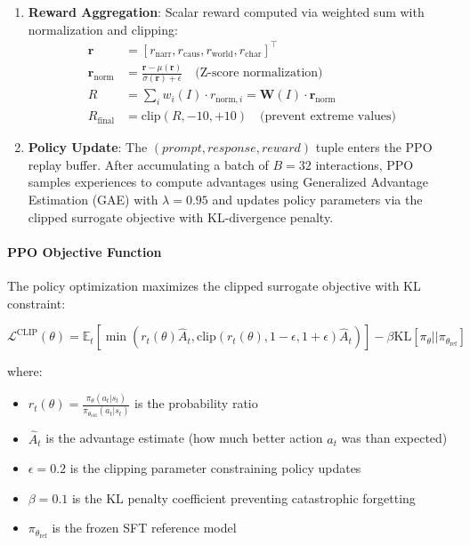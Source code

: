 \documentclass[11pt]{article}
\begin{document}
\begin{enumerate}
    Note: World and character critic weights set to 0.0 for the initial 2-critic configuration reported in Section 6. Full 4-critic integration planned for final submission.
    
    \item \textbf{Reward Aggregation}: Scalar reward computed via weighted sum with normalization and clipping:
    \begin{align}
        \mathbf{r} &= [r_{\text{narr}}, r_{\text{caus}}, r_{\text{world}}, r_{\text{char}}]^\top \\
        \mathbf{r}_{\text{norm}} &= \frac{\mathbf{r} - \mu(\mathbf{r})}{\sigma(\mathbf{r}) + \epsilon} \quad \text{(Z-score normalization)} \\
        R &= \sum_{i} w_i(I) \cdot r_{\text{norm},i} = \mathbf{W}(I) \cdot \mathbf{r}_{\text{norm}} \\
        R_{\text{final}} &= \text{clip}(R, -10, +10) \quad \text{(prevent extreme values)}
    \end{align}
    
    \item \textbf{Policy Update}: The $(prompt, response, reward)$ tuple enters the PPO replay buffer. After accumulating a batch of $B=32$ interactions, PPO samples experiences to compute advantages using Generalized Advantage Estimation (GAE) with $\lambda=0.95$ and updates policy parameters via the clipped surrogate objective with KL-divergence penalty.
\end{enumerate}

\paragraph{PPO Objective Function}
The policy optimization maximizes the clipped surrogate objective with KL constraint:

\begin{equation}
\mathcal{L}^{\text{CLIP}}(\theta) = \mathbb{E}_t \left[ \min\left(r_t(\theta) \hat{A}_t, \text{clip}(r_t(\theta), 1-\epsilon, 1+\epsilon) \hat{A}_t \right) \right] - \beta \text{KL}[\pi_\theta || \pi_{\theta_{\text{ref}}}]
\end{equation}

where:
\begin{itemize}
    \item $r_t(\theta) = \frac{\pi_\theta(a_t|s_t)}{\pi_{\theta_{\text{old}}}(a_t|s_t)}$ is the probability ratio
    \item $\hat{A}_t$ is the advantage estimate (how much better action $a_t$ was than expected)
    \item $\epsilon = 0.2$ is the clipping parameter constraining policy updates
    \item $\beta = 0.1$ is the KL penalty coefficient preventing catastrophic forgetting
    \item $\pi_{\theta_{\text{ref}}}$ is the frozen SFT reference model
\end{itemize}
\end{document}
